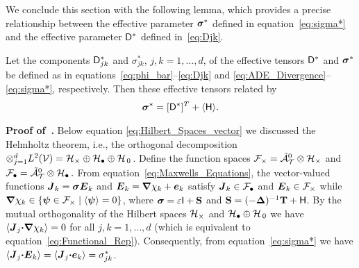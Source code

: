 \documentclass[amsa]{ipart}
\begin{document}
We conclude this section with the following lemma, which provides
a precise relationship between the effective parameter $\mbox{\boldmath${\sigma}$}^*$
defined in equation~\eqref{eq:sigma*} and the effective parameter
$\mathsf{D}^*$ defined in~\eqref{eq:Djk}. 
%
\begin{lemma}\label{lem:kappa_sigma}
%
Let the components $\mathsf{D}^*_{jk}$ and $\sigma^*_{jk}$, $j,k=1,\ldots,d$, of the
effective tensors $\mathsf{D}^*$ and $\mbox{\boldmath${\sigma}$}^*$ be defined as in
equations~\eqref{eq:phi_bar}--\eqref{eq:Djk} and
\eqref{eq:ADE_Divergence}--\eqref{eq:sigma*}, respectively. Then  
these effective tensors related by 
% 
\begin{align}\label{eq:Eff_Equiv}
  \bsig^*=[\Dm^*]^T+\langle\Hm\rangle.
\end{align}
%
\end{lemma}
%
%
\textbf{Proof of~.}\hspace{1ex}
%
Below equation \eqref{eq:Hilbert_Spaces_vector} we discussed the
Helmholtz theorem, i.e., the orthogonal decomposition
$\otimes_{j=1}^dL^2(\mathcal{V})=\mathcal{H}_\times\oplus\mathcal{H}_\bullet\oplus\mathcal{H}_{\,0}\,$. Define the function spaces 
$\mathcal{F}_\times=\tilde{\mathcal{A}}^0_{\mathcal{T}}\otimes\mathcal{H}_\times$ and $\mathcal{F}_\bullet=\tilde{\mathcal{A}}^0_{\mathcal{T}}\otimes\mathcal{H}_\bullet\,.$
From equation~\eqref{eq:Maxwells_Equations}, the vector-valued
functions $\boldsymbol{J}_k=\mbox{\boldmath${\sigma}$}\boldsymbol{E}_k$ and $\boldsymbol{E}_k=\mbox{\boldmath${\nabla}$} \chi_k+\boldsymbol{e}_k$ satisfy
$\boldsymbol{J}_k\in\mathcal{F}_\bullet$ and $\boldsymbol{E}_k\in\mathcal{F}_\times$ while
$\mbox{\boldmath${\nabla}$}\chi_k\in\{\mbox{\boldmath${\psi}$}\in\mathcal{F}_\times\;|\;\langle\mbox{\boldmath${\psi}$}\rangle=0\}$, where $\mbox{\boldmath${\sigma}$}=\varepsilon\mathsf{I}+\mathbf{S}$ and
$\mathbf{S}=(-\mbox{\boldmath${\Delta}$})^{-1}\mathbf{T}+\mathsf{H}$. By the mutual orthogonality of the 
Hilbert spaces $\mathcal{H}_\times$ and $\mathcal{H}_\bullet\oplus\mathcal{H}_{\,0}$ we have
$\langle\boldsymbol{J}_j\mbox{\boldmath${\cdot}$}\mbox{\boldmath${\nabla}$}\chi_k\rangle=0$ for all $j,k=1,\ldots,d$ (which is equivalent
to equation~\eqref{eq:Functional_Rep}). Consequently, from
equation~\eqref{eq:sigma*} we have
$\langle\boldsymbol{J}_j\mbox{\boldmath${\cdot}$}\boldsymbol{E}_k\rangle=\langle\boldsymbol{J}_j\mbox{\boldmath${\cdot}$}\boldsymbol{e}_k\rangle=\sigma^*_{jk}$.  
\end{document}
